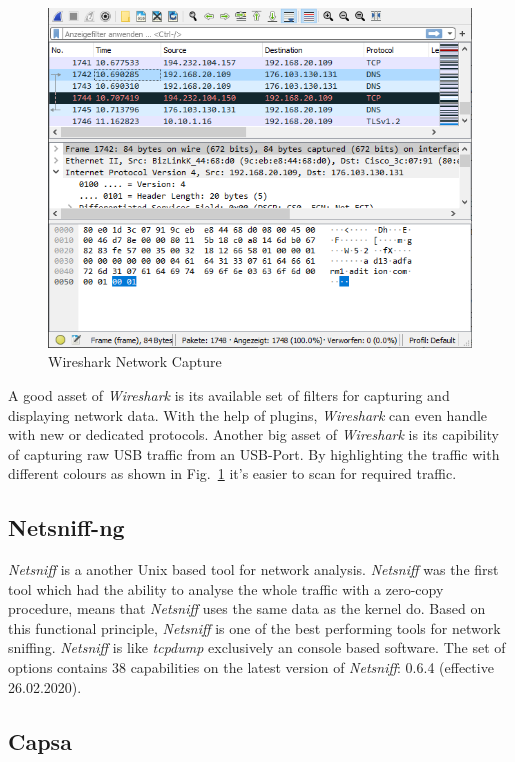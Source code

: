 \documentclass[conference]{IEEEtran}
\begin{document}
\begin{figure}[htbp]
\centerline{\includegraphics[scale=0.48]{wireshark.png}}
\caption{Wireshark Network Capture}
\label{wireshark}
\end{figure}

A good asset of \textit{Wireshark} is its available set of filters for capturing and displaying network data. With the help of plugins, \textit{Wireshark} can even handle with new or dedicated protocols. Another big asset of \textit{Wireshark} is its capibility of capturing raw USB traffic from an USB-Port. By highlighting the traffic with different colours as shown in Fig.~\ref{wireshark} it's easier to scan for required traffic.

\subsection*{Netsniff-ng}

\textit{Netsniff} is a another Unix based tool for network analysis. \textit{Netsniff} was the first tool which had the ability to analyse the whole traffic with a zero-copy procedure, means that \textit{Netsniff} uses the same data as the kernel do. Based on this functional principle, \textit{Netsniff} is one of the best performing tools for network sniffing. \textit{Netsniff} is like \textit{tcpdump} exclusively an console based software. The set of options contains 38 capabilities on the latest version of \textit{Netsniff}: 0.6.4 (effective 26.02.2020). 

\subsection*{Capsa}
\end{document}
